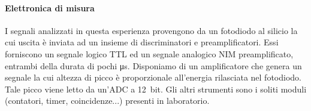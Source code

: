 \paragraph{Elettronica di misura}


I segnali analizzati in questa esperienza provengono da un fotodiodo al silicio la cui uscita è inviata ad un insieme di discriminatori e preamplificatori. Essi forniscono un segnale logico TTL ed un segnale analogico NIM preamplificato, entrambi della durata di pochi \si{\micro s}.
Disponiamo di un amplificatore che genera un segnale la cui altezza di picco è proporzionale all'energia rilasciata nel fotodiodo.
Tale picco viene letto da un'ADC a \SI{12}{bit}. Gli altri strumenti sono i soliti moduli (contatori, timer, coincidenze...) presenti in laboratorio.

